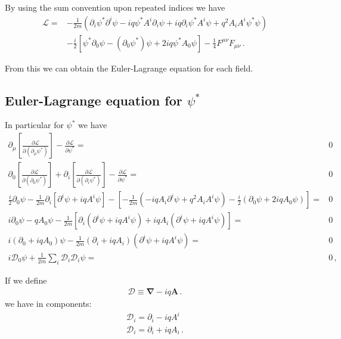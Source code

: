 By using the sum convention upon repeated indices we have
\begin{align}
  \mathcal{L}=&-\frac{1}{2m}\left(\partial_i\psi^*\partial^i\psi-i q \psi^*A^i\partial_i\psi+i q \partial_i\psi^*A^i\psi+q^2A_i A^i \psi^*\psi\right)\nonumber\\
 &-\frac{i}{2}
  \left[\psi^*\partial_0\psi-(\partial_0\psi^*)\psi+2 i q \psi^*A_0\psi\right]-\frac{1}{4}F^{\mu\nu}F_{\mu\nu}\,.
 \end{align}

From this we can obtain the Euler-Lagrange equation for each field.
\subsection{Euler-Lagrange equation for $\psi^*$}
In particular for $\psi^*$ we have
\begin{align}
  \partial_\mu\left[\frac{\partial\mathcal{L}}{\partial(\partial_\mu\psi^*)}\right]-\frac{\partial\mathcal{L}}{\partial\psi^*}=&0\nonumber\\
  \partial_0\left[\frac{\partial\mathcal{L}}{\partial(\partial_0\psi^*)}\right]+\partial_i\left[\frac{\partial\mathcal{L}}{\partial(\partial_i\psi^*)}\right]-\frac{\partial\mathcal{L}}{\partial\psi^*}=&0\nonumber\\
  \frac{i}{2}\partial_0\psi-\frac{1}{2m}\partial_i\left[\partial^i\psi+i q A^i\psi\right]
-\left[-\frac{1}{2m}\left(-i q A_i\partial^i\psi+q^2A_iA^i\psi\right)
-\frac{i}{2}\left(\partial_0\psi+2 i q A_0\psi\right)\right]=&0\nonumber\\
  i\partial_0\psi-q A_0\psi-\frac{1}{2m}\left[\partial_i\left(\partial^i\psi+i q A^i\psi\right)
+i q A_i\left(\partial^i\psi+i q A^i\psi\right)\right]
=&0\nonumber\\
  i(\partial_0+i q A_0)\psi-\frac{1}{2m}(\partial_i+i q A_i)(\partial^i\psi+i q A^i\psi)
=&0\nonumber\\
   i\mathcal{D}_0\psi
  +\frac{1}{2m}\sum_i\mathcal{D}_i\mathcal{D}_i\psi=&0\,,
\end{align}

If we define
\begin{align}
  \boldsymbol{\mathcal{D}}\equiv\boldsymbol{\nabla}-i q \mathbf{A}\,.
\end{align}
we have in components:
\begin{align}
    \boldsymbol{\mathcal{D}}_i=\partial_i-i q A^i\nonumber\\
    \boldsymbol{\mathcal{D}}_i=\partial_i+i q A_i\,.
\end{align}


